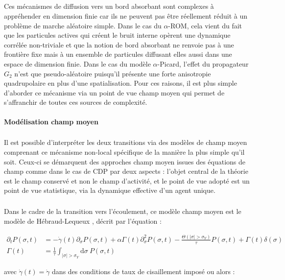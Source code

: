 \subparagraph{}Ces mécanismes de diffusion vers un bord absorbant sont complexes à appréhender en dimension finie car ils ne peuvent pas être réellement réduit à un problème de marche aléatoire simple. Dans le cas du $\alpha$-ROM, cela vient du fait que les particules actives qui créent le bruit interne opèrent une dynamique corrélée non-triviale et que la notion de bord absorbant ne renvoie pas à une frontière fixe mais à un ensemble de particules diffusant elles aussi dans une espace de dimension finie. Dans le cas du modèle $\alpha$-Picard, l'effet du propagateur $G_2$ n'est que pseudo-aléatoire puisqu'il présente une forte anisotropie quadrupolaire en plus d'une spatialisation. Pour ces raisons, il est plus simple d'aborder ce mécanisme via un point de vue champ moyen qui permet de s'affranchir de toutes ces sources de complexité. 


\paragraph{Modélisation champ moyen}

\subparagraph{}Il est possible d’interpréter les deux transitions via des modèles de champ moyen comprenant ce mécanisme non-local spécifique de la manière la plus simple qu'il soit. Ceux-ci se démarquent des approches champ moyen issues des équations de champ comme dans le cas de CDP par deux aspects : l'objet central de la théorie est le champ conservé et non le champ d'activité, et le point de vue adopté est un point de vue statistique, via la dynamique effective d'un agent unique.

\subparagraph{}Dans le cadre de la transition vers l'écoulement, ce modèle champ moyen est le modèle de Hébraud-Lequeux \cite{hebraud_mode-coupling_1998}, décrit par l'équation :

\begin{equation}
\begin{aligned}
	\partial_t P(\sigma, t) &= -\dot{\gamma}(t)\partial_\sigma P(\sigma, t) + \alpha\Gamma(t)\partial_\sigma^2P(\sigma, t) - \frac{\Theta (|\sigma|>\sigma_Y)}{\tau}P(\sigma, t) + \Gamma(t)\delta(\sigma)\\
	\Gamma(t) &= \frac{1}{\tau}\int_{|\sigma|>\sigma_Y}\mathrm{d}\sigma ~ P(\sigma, t)
\end{aligned}
\end{equation}

\noindent avec $\dot{\gamma}(t) = \dot{\gamma}$ dans des conditions de taux de cisaillement imposé ou alors :


